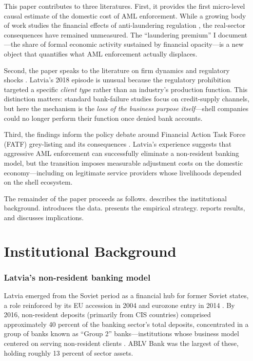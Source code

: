 \documentclass[12pt]{article}
\begin{document}
This paper contributes to three literatures. First, it provides the first micro-level causal estimate of the domestic cost of AML enforcement. While a growing body of work studies the financial effects of anti-laundering regulation \citep{Sharman2011,Findley2015,Collin2020}, the real-sector consequences have remained unmeasured. The ``laundering premium'' I document---the share of formal economic activity sustained by financial opacity---is a new object that quantifies what AML enforcement actually displaces.

Second, the paper speaks to the literature on firm dynamics and regulatory shocks \citep{Klapper2006,Djankov2002,Bruhn2011}. Latvia's 2018 episode is unusual because the regulatory prohibition targeted a specific \textit{client type} rather than an industry's production function. This distinction matters: standard bank-failure studies \citep{Chodorow-Reich2014,Huber2018} focus on credit-supply channels, but here the mechanism is the \textit{loss of the business purpose itself}---shell companies could no longer perform their function once denied bank accounts.

Third, the findings inform the policy debate around Financial Action Task Force (FATF) grey-listing and its consequences \citep{Masciandaro2008,Halliday2014}. Latvia's experience suggests that aggressive AML enforcement can successfully eliminate a non-resident banking model, but the transition imposes measurable adjustment costs on the domestic economy---including on legitimate service providers whose livelihoods depended on the shell ecosystem.

The remainder of the paper proceeds as follows.  describes the institutional background.  introduces the data.  presents the empirical strategy.  reports results, and  discusses implications.

\section{Institutional Background}
\label{sec:background}

\subsubsection*{Latvia's non-resident banking model} Latvia emerged from the Soviet period as a financial hub for former Soviet states, a role reinforced by its EU accession in 2004 and eurozone entry in 2014 \citep{EBRD2018}. By 2016, non-resident deposits (primarily from CIS countries) comprised approximately 40 percent of the banking sector's total deposits, concentrated in a group of banks known as ``Group 2'' banks---institutions whose business model centered on serving non-resident clients \citep{BankOfLatvia2018}. ABLV Bank was the largest of these, holding roughly 13 percent of sector assets.
\end{document}
